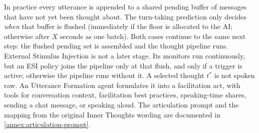 In practice every utterance is appended to a shared pending buffer of messages that have not yet
been thought about. The turn-taking prediction only decides \emph{when} that buffer is flushed
(immediately if the floor is allocated to the AI; otherwise after $X$ seconds as one batch). Both
cases continue to the same next step: the flushed pending set is assembled and the thought pipeline
runs. External Stimulus Injection is not a later stage. Its monitors run continuously, but an ESI
policy joins the pipeline only at that flush, and only if a trigger is active; otherwise the
pipeline runs without it. A selected thought $t^{*}$ is not spoken raw. An Utterance Formation
agent formulates it into a facilitation act, with tools for conversation context, facilitation best
practices, speaking-time shares, sending a chat message, or speaking aloud.
The articulation prompt and the mapping from the original Inner Thoughts
wording are documented in \autoref{annex:articulation-prompt}.

